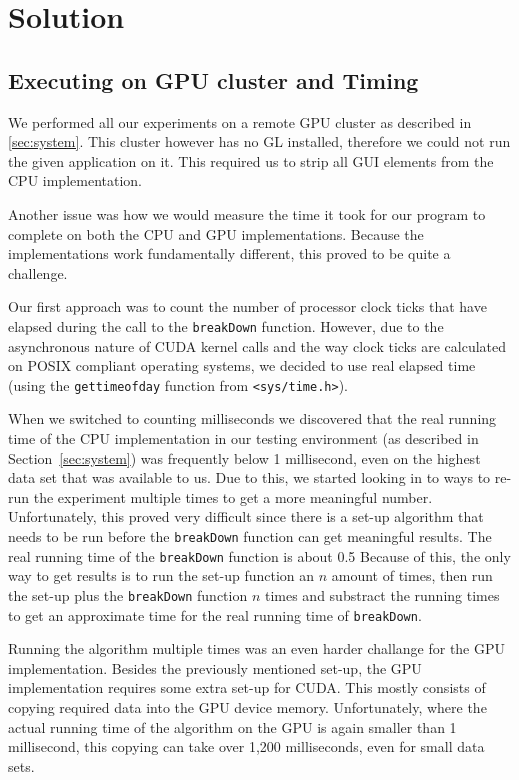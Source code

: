 \section{Solution}
\subsection{Executing on GPU cluster and Timing}
We performed all our experiments on a remote GPU cluster as described in \ref{sec:system}.
This cluster however has no GL installed, therefore we could not run the given application on it.
This required us to strip all GUI elements from the CPU implementation.


Another issue was how we would measure the time it took for our program to complete on both the CPU and GPU implementations.
Because the implementations work fundamentally different, this proved to be quite a challenge.

Our first approach was to count the number of processor clock ticks that have elapsed during the call to the \texttt{breakDown} function.
However, due to the asynchronous nature of CUDA kernel calls and the way clock ticks are calculated on POSIX compliant operating systems, we decided to use real elapsed time (using the \texttt{gettimeofday} function from \texttt{<sys/time.h>}).

When we switched to counting milliseconds we discovered that the real running time of the CPU implementation in our testing environment (as described in Section~\ref{sec:system}) was frequently below 1 millisecond, even on the highest data set that was available to us.
Due to this, we started looking in to ways to re-run the experiment multiple times to get a more meaningful number.
Unfortunately, this proved very difficult since there is a set-up algorithm that needs to be run before the \texttt{breakDown} function can get meaningful results.
The real running time of the \texttt{breakDown} function is about 0.5%
Because of this, the only way to get results is to run the set-up function an $n$ amount of times, then run the set-up plus the \texttt{breakDown} function $n$ times and substract the running times to get an approximate time for the real running time of \texttt{breakDown}.

Running the algorithm multiple times was an even harder challange for the GPU implementation.
Besides the previously mentioned set-up, the GPU implementation requires some extra set-up for CUDA.
This mostly consists of copying required data into the GPU device memory.
Unfortunately, where the actual running time of the algorithm on the GPU is again smaller than 1 millisecond, this copying can take over 1,200 milliseconds, even for small data sets.

